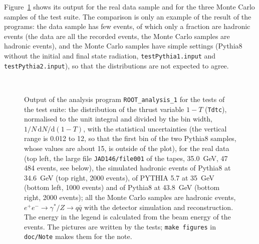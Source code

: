 Figure~\ref{fig:thrust} shows its output for the real data sample and for the three Monte Carlo samples of the test suite. The comparison is only an example of the result of the programs:
the data sample has few events, of which only a fraction are hadronic events (the data are all the recorded events, the Monte Carlo samples are hadronic events), and the Monte Carlo samples have simple settings (Pythia8 without the initial and final state radiation, \texttt{testPythia1.input} and \texttt{testPythia2.input}), so that the distributions are not expected to agree.
\begin{figure}[H]
\centering
{}\hfill
{}\\[1ex]
\hfill
{}
\caption{Output of the analysis program \texttt{ROOT\_analysis\_1} for the tests of the test suite: the distribution of the thrust variable $1-T$ (\texttt{Tdtc}), normalised to the unit integral and divided by the bin width, $1/N\,\mathrm{d}N/\mathrm{d}(1-T)$, with the statistical uncertainties (the vertical range is 0.012 to 12, so that the first bin of the two Pythia8 samples, whose values are about 15, is outside of the plot), for the real data (top left, the large file \texttt{JAD146/file001} of the tapes, 35.0~GeV, 47\,484 events, see below),
the simulated hadronic events of Pythia8 at 34.6~GeV (top right, 2000 events), of PYTHIA 5.7 at 35~GeV (bottom left, 1000 events) and of Pythia8 at 43.8~GeV (bottom right, 2000 events); all the Monte Carlo samples are hadronic events, $e^+e^-\to\gamma^*/Z\to q\bar q$ with the detector simulation and reconstruction. The energy in the legend is calculated from the beam energy of the events. The pictures are written by the tests; \texttt{make figures} in \texttt{doc/Note} makes them for the note.}
\label{fig:thrust}
\end{figure}

